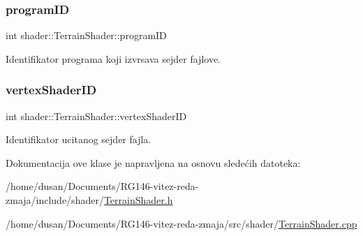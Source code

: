 \subsubsection{\texorpdfstring{program\+ID}{programID}}
{\footnotesize\ttfamily int shader\+::\+Terrain\+Shader\+::program\+ID\hspace{0.3cm}{\ttfamily [private]}}



Identifikator programa koji izvrsava sejder fajlove. 

\mbox{\label{classshader_1_1TerrainShader_a5f65bb56d6c39b58e79488d2d4409396}} 
\subsubsection{\texorpdfstring{vertex\+Shader\+ID}{vertexShaderID}}
{\footnotesize\ttfamily int shader\+::\+Terrain\+Shader\+::vertex\+Shader\+ID\hspace{0.3cm}{\ttfamily [private]}}



Identifikator ucitanog sejder fajla. 



Dokumentacija ove klase je napravljena na osnovu sledećih datoteka\+:\begin{DoxyCompactItemize}
\item 
/home/dusan/\+Documents/\+R\+G146-\/vitez-\/reda-\/zmaja/include/shader/\hyperlink{TerrainShader_8h}{Terrain\+Shader.\+h}\item 
/home/dusan/\+Documents/\+R\+G146-\/vitez-\/reda-\/zmaja/src/shader/\hyperlink{TerrainShader_8cpp}{Terrain\+Shader.\+cpp}\end{DoxyCompactItemize}
